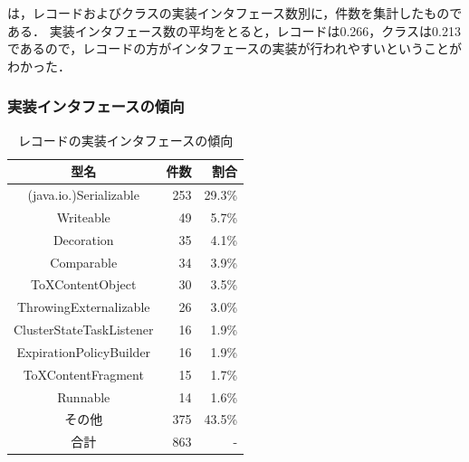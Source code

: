 は，レコードおよびクラスの実装インタフェース数別に，件数を集計したものである．
実装インタフェース数の平均をとると，レコードは0.266，クラスは0.213であるので，レコードの方がインタフェースの実装が行われやすいということがわかった．

\subsubsection{実装インタフェースの傾向\label{interface_trend}}

\begin{table}[t]
    \caption{レコードの実装インタフェースの傾向}
    \label{record_interface_types}
    \centering
    \begin{tabular}{c||r|r}
        \hline
        型名 & 件数 & 割合\\
        \hline\hline
        (java.io.)Serializable & 253 & 29.3\%\\
        Writeable & 49 & 5.7\%\\
        Decoration & 35 & 4.1\%\\
        Comparable & 34 & 3.9\%\\
        ToXContentObject & 30 & 3.5\%\\
        ThrowingExternalizable & 26 & 3.0\%\\
        ClusterStateTaskListener & 16 & 1.9\%\\
        ExpirationPolicyBuilder & 16 & 1.9\%\\
        ToXContentFragment & 15 & 1.7\%\\
        Runnable & 14 & 1.6\%\\
        その他 & 375 & 43.5\%\\
        \hline
        合計 & 863 & -\\
        \hline
    \end{tabular}
\end{table}

